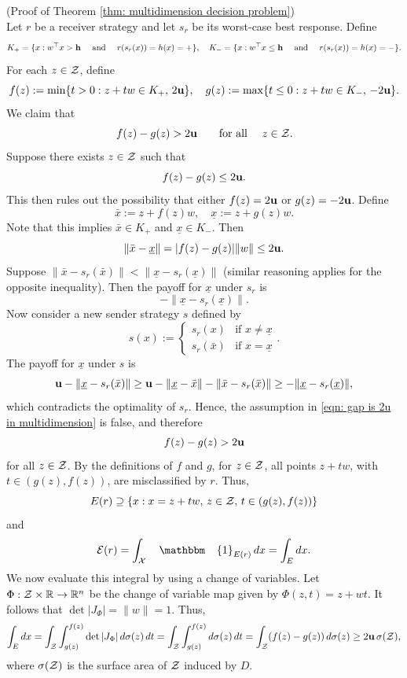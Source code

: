 \begin{apdxproof}{(Proof of Theorem \ref{thm: multidimension decision problem})}\label{proof: multidemnsional decision}\\
Let $r$ be a receiver strategy and let $s_r$ be its worst-case best response. Define
\[
K_+ = \{x : w^\top x > \mathbf{h}\ \hbox{\quad and\quad}\ r(s_r(x)) = h(x) = \mathbf{+}\}, \quad 
K_- = \{x : w^\top x \leq \mathbf{h}\ \hbox{\quad and\quad}\ r(s_r(x)) = h(x) = \mathbf{-}\}.
\]
For each $z \in \mathcal{Z}$, define
\[
f(z) := \min \{t > 0 : z + tw \in K_+,\, 2\mathbf{u}\}, \quad
g(z) := \max \{t \leq 0 : z + tw \in K_-,\, -2\mathbf{u}\}.
\]
We claim that
\[
f(z) - g(z) > 2\mathbf{u} \quad \hbox{\quad for all \quad} z \in \mathcal{Z}.
\]
Suppose there exists $z \in \mathcal{Z}$ such that
\begin{equation}\label{eqn: gap is 2u in multidimension}
    f(z) - g(z) \leq 2\mathbf{u}.
\end{equation}
This then rules out the possibility that either $f(z) = 2\mathbf{u}$ or $g(z) = -2\mathbf{u}$.
Define
\[
\bar{x} := z + f(z)w, \quad \underline{x} := z + g(z)w.
\]
Note that this implies $\bar{x} \in K_+$ and $\underline{x} \in K_-$.
Then
\[
\|\bar{x} - \underline{x}\| = |f(z)-g(z)|\|w\| \leq 2\mathbf{u}.
\]
Suppose $\|\bar{x} - s_r(\bar{x})\| < \|\underline{x} - s_r(\underline{x})\|$ (similar reasoning applies for the opposite inequality).
Then the payoff for $\underline{x}$ under $s_r$ is
\[
- \|\underline{x} - s_r(\underline{x})\|.
\]
Now consider a new sender strategy $s$ defined by
\[
s(x) := 
\begin{cases}
s_r(x) & \text{if } x \neq \underline{x} \\
s_r(\bar{x}) & \text{if } x = \underline{x}
\end{cases}.
\]
The payoff for $\underline{x}$ under $s$ is
\[
\mathbf{u} - \|\underline{x} - s_r(\bar{x})\| \geq \mathbf{u} - \|\underline{x} - \bar{x}\| - \|\bar{x} - s_r(\bar{x})\| \geq -\|\underline{x} - s_r(\underline{x})\|,
\]
which contradicts the optimality of $s_r$. Hence, the assumption in \eqref{eqn: gap is 2u in multidimension} is false, and therefore
\[
f(z) - g(z) > 2\mathbf{u} 
\]
for all $z \in \mathcal{Z}$.
By the definitions of $f$ and $g$, for $z \in \mathcal{Z}$, all points $z + tw$, with $t \in (g(z), f(z))$, are misclassified by $r$. Thus,
\[
E(r) \supseteq \{x: x = z + tw,\, z \in \mathcal{Z},\, t \in (g(z),f(z))\}
\]
and 
\[
\cg{E}(r) = \int_{\cg{X}}\mathbbm{1}_{E(r)}\,dx = \int_{E}dx.
\]
We now evaluate this integral by using a change of variables. Let $\Phi: \mathcal{Z} \times \mathbb{R} \rightarrow \mathbb{R}^n$ be the change of variable map given by $\Phi(z,t) = z + wt$. It follows that $\det|J_\Phi| = \|w\| = 1$. Thus,
\[
\int_E dx = \int_{\mathcal{Z}}\int_{g(z)}^{f(z)} \mathop{{\rm det}}|J_{\Phi}|\,d\sigma(z)\, dt = \int_{\mathcal{Z}}\int_{g(z)}^{f(z)} d\sigma(z)\,dt = \int_{\mathcal{Z}}(f(z) - g(z))\, d\sigma(z) \geq 2\mathbf{u}\,\sigma(\mathcal{Z}),
\]
where $\sigma(\mathcal{Z})$ is the surface area of $\mathcal{Z}$ induced by $D$.
\end{apdxproof}

